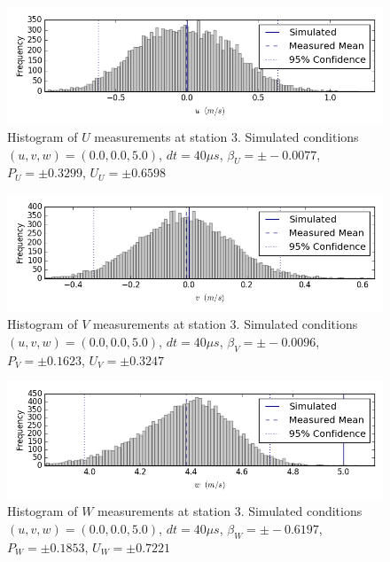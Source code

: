 \begin{figure}[H]
\centering
\includegraphics[width=6in]{figs/Ely_May28th03001/uncertainty_Ely_May28th03001_U}
\caption{Histogram of $U$ measurements at station 3. Simulated conditions $(u,v,w)=(0.0, 0.0, 5.0)$, $dt=40 \mu s$, $\beta_U=\pm -0.0077$, $P_U=\pm 0.3299$, $U_U=\pm 0.6598$}
\label{fig:uncertainty_Ely_May28th03001_U}
\end{figure}


\begin{figure}[H]
\centering
\includegraphics[width=6in]{figs/Ely_May28th03001/uncertainty_Ely_May28th03001_V}
\caption{Histogram of $V$ measurements at station 3. Simulated conditions $(u,v,w)=(0.0, 0.0, 5.0)$, $dt=40 \mu s$, $\beta_V=\pm -0.0096$, $P_V=\pm 0.1623$, $U_V=\pm 0.3247$}
\label{fig:uncertainty_Ely_May28th03001_V}
\end{figure}


\begin{figure}[H]
\centering
\includegraphics[width=6in]{figs/Ely_May28th03001/uncertainty_Ely_May28th03001_W}
\caption{Histogram of $W$ measurements at station 3. Simulated conditions $(u,v,w)=(0.0, 0.0, 5.0)$, $dt=40 \mu s$, $\beta_W=\pm -0.6197$, $P_W=\pm 0.1853$, $U_W=\pm 0.7221$}
\label{fig:uncertainty_Ely_May28th03001_W}
\end{figure}


